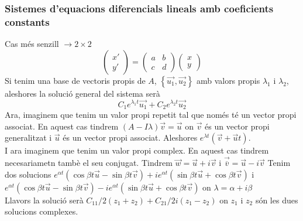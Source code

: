 \documentclass[../main.tex]{subfiles}
\begin{document}
\subsubsection{Sistemes d'equacions diferencials lineals amb coeficients constants}
Cas més senzill $\rightarrow 2\times2$
\begin{displaymath}
	\begin{pmatrix}x'\\y'\end{pmatrix} = \begin{pmatrix}a & b\\c & d\end{pmatrix}\begin{pmatrix}x\\y\end{pmatrix}
\end{displaymath}
Si tenim una base de vectoris propis de $A$, $\left\{\vec{u_1}, \vec{u_2}\right\}$ amb valors propis $\lambda_1$ i $\lambda_2$, aleshores la solució general del sistema serà
\begin{displaymath}
	C_1e^{\lambda_1t}\vec{u_1} + C_2e^{\lambda_2t}\vec{u_2}
\end{displaymath}
Ara, imaginem que tenim un valor propi repetit tal que només té un vector propi associat. En aquest cas tindrem
$(A-I\lambda)\vec{v} = \vec{u}$ on $\vec{v}$ és un vector propi generalitzat i $\vec{u}$ és un vector propi associat. Aleshores $e^{\lambda t}(\vec{v}+\vec{u}t)$.\\
I ara imaginem que tenim un valor propi complex. En aquest cas tindrem necesariametn tambè el seu conjugat. Tindrem $\vec{w} = \vec{u} + i\vec{v}$ i $\vec{\overline{v}} = \vec{u} - i\vec{v}$
Tenim dos solucions $e^{\alpha t}(\cos{\beta t} \vec{u} - \sin{\beta t}\vec{v}) + ie^{\alpha t}(\sin{\beta t}\vec{u} + \cos{\beta t}\vec{v})$
i $e^{\alpha t}(\cos{\beta t} \vec{u} - \sin{\beta t}\vec{v}) - ie^{\alpha t}(\sin{\beta t}\vec{u} + \cos{\beta t}\vec{v})$ on $\lambda = \alpha + i\beta$\\
Llavors la solució serà $C_11/2(z_1 + z_2) + C_21/{2i}(z_1-z_2)$ on $z_1$ i $z_2$ són les dues solucions complexes.
\end{document}
